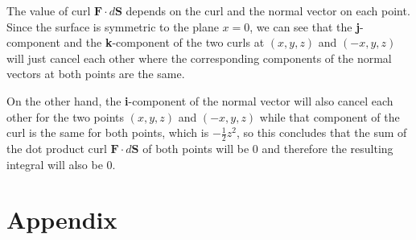 \documentclass{article}
\begin{document}
\begin{enumerate}
\begin{enumerate}
    The value of $\text{curl }\textbf{F}\cdot d\textbf{S}$ depends on the curl and the normal vector on each point. Since the surface is symmetric to the plane $x=0$, we can see that the \textbf{j}-component and the \textbf{k}-component of the two curls at $(x,y,z)$ and $(-x,y,z)$ will just cancel each other where the corresponding components of the normal vectors at both points are the same.
    
    On the other hand, the \textbf{i}-component of the normal vector will also cancel each other for the two points $(x,y,z)$ and $(-x,y,z)$ while that component of the curl is the same for both points, which is $-\frac{1}{2}z^2$, so this concludes that the sum of the dot product $\text{curl }\textbf{F}\cdot d\textbf{S}$ of both points will be 0 and therefore the resulting integral will also be 0.
    \end{enumerate}
\end{enumerate}

\newpage
\section*{Appendix}
\end{document}
